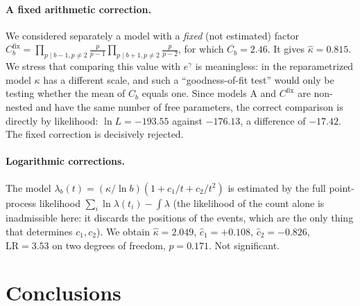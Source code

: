 \documentclass[11pt,a4paper]{article}
\theoremstyle{plain}
\theoremstyle{remark}
\newcommand{\eg}{e^{\gamma}}
\begin{document}
\paragraph{A fixed arithmetic correction.} We considered separately a model with
a \emph{fixed} (not estimated) factor
$C^{\mathrm{fix}}_b=\prod_{p\mid b-1,p\ne2}\frac{p}{p-1}\prod_{p\mid b+1,p\ne2}\frac{p}{p-2}$,
for which $\overline{C_b}=2.46$. It gives $\hat\kappa=0.815$. We stress that
comparing this value with $\eg$ is meaningless: in the reparametrized model
$\kappa$ has a different scale, and such a ``goodness-of-fit test'' would only
be testing whether the mean of $C_b$ equals one. Since models A and
$C^{\mathrm{fix}}$ are non-nested and have the same number of free parameters,
the correct comparison is directly by likelihood: $\ln L=-193.55$ against
$-176.13$, a difference of $-17.42$. The fixed correction is decisively
rejected.

\paragraph{Logarithmic corrections.} The model
$\lambda_b(t)=(\kappa/\ln b)(1+c_1/t+c_2/t^2)$ is estimated by the full
point-process likelihood $\sum_i\ln\lambda(t_i)-\int\lambda$ (the likelihood of
the count alone is inadmissible here: it discards the positions of the events,
which are the only thing that determines $c_1,c_2$). We obtain
$\hat\kappa=2.049$, $\hat c_1=+0.108$, $\hat c_2=-0.826$, $\mathrm{LR}=3.53$ on
two degrees of freedom, $p=0.171$. Not significant.

\section{Conclusions}
\end{document}
